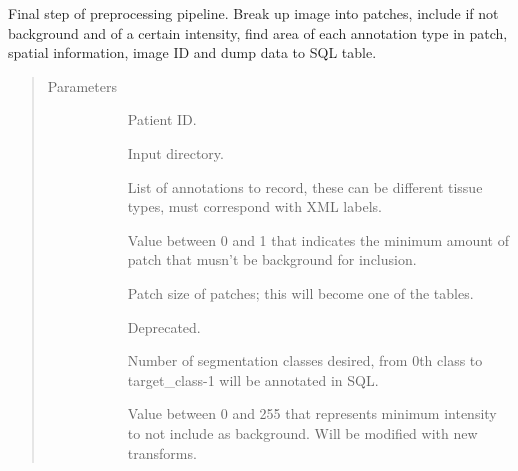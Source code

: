 \documentclass[letterpaper,10pt,english]{sphinxmanual}
\begin{document}
\begin{fulllineitems}
\label{\detokenize{index:pathflowai.utils.extract_patch_information}}
Final step of preprocessing pipeline. Break up image into patches, include if not background and of a certain intensity, find area of each annotation type in patch, spatial information, image ID and dump data to SQL table.
\begin{quote}\begin{description}
\item[{Parameters}] \leavevmode\begin{description}
\item[{}] \leavevmode
Patient ID.

\item[{}] \leavevmode
Input directory.

\item[{}] \leavevmode
List of annotations to record, these can be different tissue types, must correspond with XML labels.

\item[{}] \leavevmode
Value between 0 and 1 that indicates the minimum amount of patch that musn’t be background for inclusion.

\item[{}] \leavevmode
Patch size of patches; this will become one of the tables.

\item[{}] \leavevmode
Deprecated.

\item[{}] \leavevmode
Number of segmentation classes desired, from 0th class to target\_class-1 will be annotated in SQL.

\item[{}] \leavevmode
Value between 0 and 255 that represents minimum intensity to not include as background. Will be modified with new transforms.


\end{description}
\end{description}
\end{quote}
\end{fulllineitems}
\end{document}
